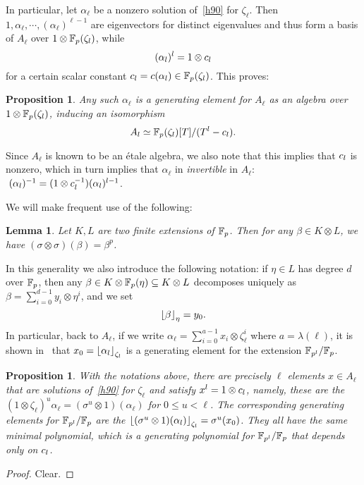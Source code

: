 \documentclass{sig-alternate}
\newtheorem{proposition}[theorem]{Proposition}
\newtheorem{lemma}[theorem]{Lemma}
\begin{document}
In particular, let $\alpha_\ell$ be a nonzero solution of~\eqref{h90} for $\zeta_\ell$.
Then $1,\alpha_\ell,\cdots,(\alpha_\ell)^{\ell-1}$ are eigenvectors for distinct eigenvalues and thus
form a basis of $A_\ell$ over $1\otimes\mathbb{F}_{p}(\zeta_{l})$,
while
\[ (\alpha_l)^l = 1\otimes c_l \]
for a certain scalar constant $c_l=c(\alpha_l)\in\mathbb{F}_{p}(\zeta_l)$.
This proves:
\begin{proposition}
\label{alphagen}
Any such $\alpha_\ell$ is a generating element for $A_\ell$ as an algebra over $1\otimes\mathbb{F}_{p}(\zeta_{l})$,
inducing an isomorphism
\[ A_l\simeq \mathbb{F}_{p}(\zeta_{l})[T]/(T^l-c_l). \]
\end{proposition}

Since $A_\ell$ is known to be an \'etale algebra, we also note that this implies
that $c_l$ is nonzero, which in turn implies
that $\alpha_\ell$ in \emph{invertible} in $A_\ell$: $\;(\alpha_l)^{-1} = (1\otimes c_l^{-1})(\alpha_l)^{l-1}$.


We will make frequent use of the following:
\begin{lemma}
\label{FrobFrob}
Let $K,L$ are two finite extensions of $\mathbb{F}_{p}$.
Then for any $\beta\in K\otimes L$,
we have $(\sigma\otimes\sigma)(\beta)=\beta^p$.
\end{lemma}
In this generality we also introduce the following notation: if $\eta\in L$ has degree $d$ over $\mathbb{F}_{p}$,
then any $\beta\in K\otimes\mathbb{F}_{p}(\eta)\subseteq K\otimes L$ decomposes uniquely as $\beta = \sum_{i =  0}^{d-1}y_i\otimes\eta^i$,
and we set  \[ \left\lfloor \beta \right\rfloor_{\eta}=y_0. \]
In particular, back to $A_\ell$, if we write
$\alpha_\ell = \sum_{i =  0}^{a-1}x_i\otimes\zeta_{\ell}^i$ where $a=\lambda(\ell)$,
it is shown in~\cite{Allombert02} that $x_0=\left\lfloor \alpha_l \right\rfloor_{\zeta_l}$ is a generating element for the extension
$\mathbb{F}_{p^l}/\mathbb{F}_{p}$.

\begin{proposition}
\label{depend}
With the notations above, there are precisely $\ell$ elements $x\in A_\ell$ that are solutions of~\eqref{h90} for $\zeta_\ell$
and satisfy $x^l=1\otimes c_l$, namely, these are the $(1\otimes\zeta_\ell)^u\alpha_\ell=(\sigma^u\otimes 1)(\alpha_\ell)$
for $0\leq u<\ell$.
The corresponding generating elements for $\mathbb{F}_{p^l}/\mathbb{F}_{p}$ are the $\left\lfloor (\sigma^u\otimes 1)(\alpha_l) \right\rfloor_{\zeta_l}=\sigma^u(x_0)$.
They all have the same minimal polynomial, which is a generating polynomial for $\mathbb{F}_{p^l}/\mathbb{F}_{p}$ that depends only on $c_l$.
\end{proposition}
\begin{proof}
Clear.
\end{proof}
\end{document}
